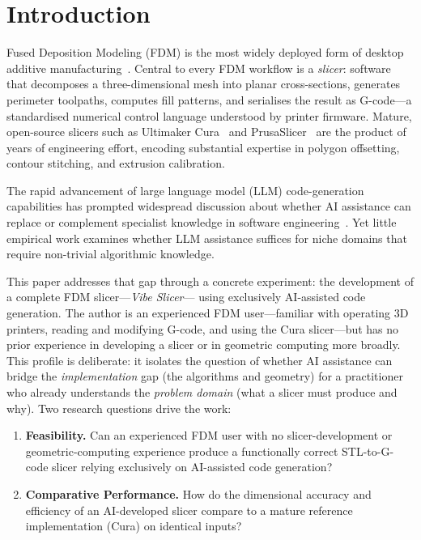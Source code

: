 \documentclass[10pt,twocolumn,a4paper]{article}
\begin{document}
\section{Introduction}

Fused Deposition Modeling (FDM) is the most widely deployed form
of desktop additive manufacturing~\cite{guo2013additive}.
Central to every FDM workflow is a \emph{slicer}: software that
decomposes a three-dimensional mesh into planar cross-sections,
generates perimeter toolpaths, computes fill patterns,
and serialises the result as G-code—a standardised numerical
control language understood by printer firmware.
Mature, open-source slicers such as Ultimaker Cura~\cite{cura}
and PrusaSlicer~\cite{prusaslicer} are the product of years
of engineering effort, encoding substantial expertise in polygon
offsetting, contour stitching, and extrusion calibration.

The rapid advancement of large language model (LLM) code-generation
capabilities has prompted widespread discussion about whether AI
assistance can replace or complement specialist knowledge in software
engineering~\cite{chen2021codex,jiang2023survey}.
Yet little empirical work examines whether LLM assistance suffices
for niche domains that require non-trivial algorithmic knowledge.

This paper addresses that gap through a concrete experiment:
the development of a complete FDM slicer—\emph{Vibe Slicer}—
using exclusively AI-assisted code generation.
The author is an experienced FDM user—familiar with operating
3D printers, reading and modifying G-code, and using the Cura
slicer—but has no prior experience in developing a slicer or in
geometric computing more broadly. This profile is deliberate:
it isolates the question of whether AI assistance can bridge the
\emph{implementation} gap (the algorithms and geometry) for a
practitioner who already understands the \emph{problem domain}
(what a slicer must produce and why).
Two research questions drive the work:

\begin{enumerate}[label=\textbf{RQ\arabic*.}]
  \item \textbf{Feasibility.} Can an experienced FDM user with no
        slicer-development or geometric-computing experience produce
        a functionally correct STL-to-G-code slicer relying
        exclusively on AI-assisted code generation?
  \item \textbf{Comparative Performance.} How do the dimensional
        accuracy and efficiency of an AI-developed slicer compare to a
        mature reference implementation (Cura) on identical inputs?
\end{enumerate}
\end{document}
